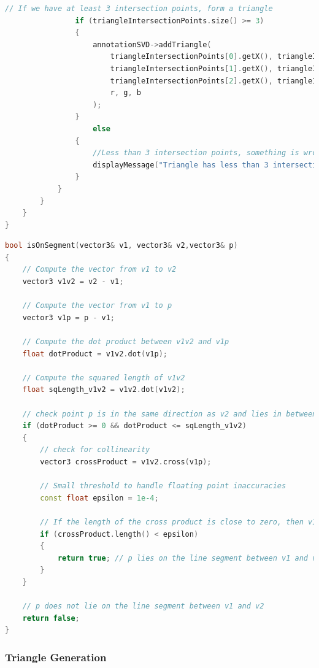 \begin{lstlisting}[language=C++, caption=Mesh generation in Dual Marching Cubes Algorithm, label=lst:meshGenerationDMC]
				// If we have at least 3 intersection points, form a triangle
				if (triangleIntersectionPoints.size() >= 3) 
				{
					annotationSVD->addTriangle(
						triangleIntersectionPoints[0].getX(), triangleIntersectionPoints[0].getY(), triangleIntersectionPoints[0].getZ(),
						triangleIntersectionPoints[1].getX(), triangleIntersectionPoints[1].getY(), triangleIntersectionPoints[1].getZ(),
						triangleIntersectionPoints[2].getX(), triangleIntersectionPoints[2].getY(), triangleIntersectionPoints[2].getZ(),
						r, g, b
					);
				}
                    else
				{
					//Less than 3 intersection points, something is wrong
					displayMessage("Triangle has less than 3 intersection points\n");
				}
			}
		}
	}
}

\end{lstlisting}

\vspace{2mm}
\begin{lstlisting}[language=C++, caption=Checking Point Collinearity, label=lst:isOnSegment]
bool isOnSegment(vector3& v1, vector3& v2,vector3& p)
{
    // Compute the vector from v1 to v2
	vector3 v1v2 = v2 - v1;
    
    // Compute the vector from v1 to p
	vector3 v1p = p - v1;

    // Compute the dot product between v1v2 and v1p
	float dotProduct = v1v2.dot(v1p);
    
    // Compute the squared length of v1v2
	float sqLength_v1v2 = v1v2.dot(v1v2);

    // check point p is in the same direction as v2 and lies in between
	if (dotProduct >= 0 && dotProduct <= sqLength_v1v2) 
    {
		// check for collinearity
		vector3 crossProduct = v1v2.cross(v1p);
        
        // Small threshold to handle floating point inaccuracies
		const float epsilon = 1e-4;
        
        // If the length of the cross product is close to zero, then v1, p, and v2 are collinear
		if (crossProduct.length() < epsilon) 
        {
			return true; // p lies on the line segment between v1 and v2
		}
	}
    
    // p does not lie on the line segment between v1 and v2
	return false;
}
\end{lstlisting}

\subsubsection{Triangle Generation}

